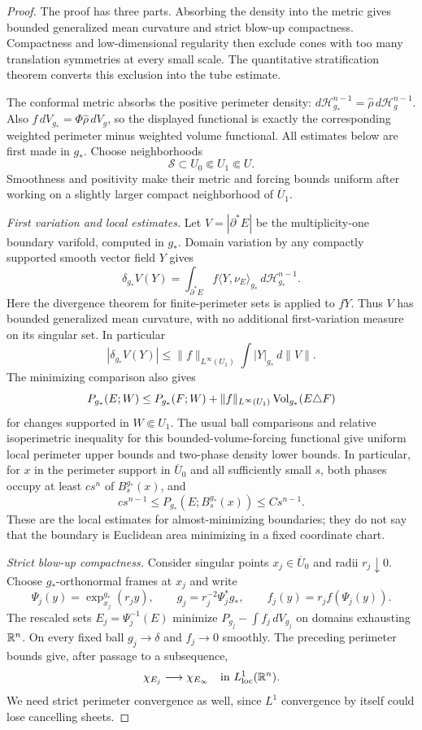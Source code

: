 \begin{proof}
The proof has three parts. Absorbing the density into the metric
gives bounded generalized mean curvature and strict blow-up
compactness. Compactness and low-dimensional regularity then exclude
cones with too many translation symmetries at every small scale.
The quantitative stratification theorem converts this exclusion into
the tube estimate.

The conformal metric absorbs the positive perimeter density:
$d\mathcal H_{g_*}^{n-1}=\widehat\rho\,
d\mathcal H_g^{n-1}$. Also
$f\,dV_{g_*}=\Phi\widehat\rho\,dV_g$, so the displayed
functional is exactly the corresponding weighted perimeter minus
weighted volume functional. All estimates below are first made
in $g_*$. Choose neighborhoods
\[
 \mathcal S\subset U_0\Subset U_1\Subset U.
\]
Smoothness and positivity make their metric and forcing bounds
uniform after working on a slightly larger compact neighborhood
of $\overline U_1$.

\emph{First variation and local estimates.}
Let $V=|\partial^*E|$ be the multiplicity-one boundary varifold,
computed in $g_*$. Domain variation by any compactly supported
smooth vector field $Y$ gives
\[
 \delta_{g_*}V(Y)
    =\int_{\partial^*E} f\langle Y,\nu_E\rangle_{g_*}\,
                      d\mathcal H_{g_*}^{n-1}.
\]
Here the divergence theorem for finite-perimeter sets is applied
to $fY$. Thus $V$ has bounded generalized mean curvature, with
no additional first-variation measure on its singular set. In
particular
\[
 |\delta_{g_*}V(Y)|
       \le\|f\|_{L^\infty(U_1)}\int |Y|_{g_*}\,d\|V\|.
\]
The minimizing comparison also gives
\begin{equation}\label{eq:rpi:bw-almost-minimizing}
 P_{g_*}(E;W)\le P_{g_*}(F;W)
       +\|f\|_{L^\infty(U_1)}
                       \operatorname{Vol}_{g_*}(E\triangle F)
\end{equation}
for changes supported in $W\Subset U_1$. The usual ball
comparisons and relative isoperimetric inequality for this
bounded-volume-forcing functional give uniform local perimeter
upper bounds and two-phase density lower bounds. In particular,
for $x$ in the perimeter support in $\overline U_0$ and all
sufficiently small $s$, both phases occupy at least $c s^n$ of
$B_s^{g_*}(x)$, and
\[
 c s^{n-1}\le P_{g_*}(E;B_s^{g_*}(x))\le C s^{n-1}.
\]
These are the local estimates for almost-minimizing boundaries;
they do not say that the boundary is Euclidean area minimizing
in a fixed coordinate chart.

\emph{Strict blow-up compactness.}
Consider singular points $x_j\in\overline U_0$ and radii
$r_j\downarrow0$. Choose $g_*$-orthonormal frames at $x_j$ and
write
\[
 \Psi_j(y)=\exp_{x_j}^{g_*}(r_jy),\qquad
 g_j=r_j^{-2}\Psi_j^*g_*,\qquad
 f_j(y)=r_j f(\Psi_j(y)).
\]
The rescaled sets $E_j=\Psi_j^{-1}(E)$ minimize
$P_{g_j}-\int f_j\,dV_{g_j}$ on domains exhausting $\mathbb R^n$.
On every fixed ball $g_j\to\delta$ and $f_j\to0$ smoothly.
The preceding perimeter bounds give, after passage to a
subsequence,
\[
 \chi_{E_j}\longrightarrow\chi_{E_\infty}
          \quad\hbox{in }L^1_{\rm loc}(\mathbb R^n).
\]
We need strict perimeter convergence as well, since $L^1$
convergence by itself could lose cancelling sheets.


\end{proof}
